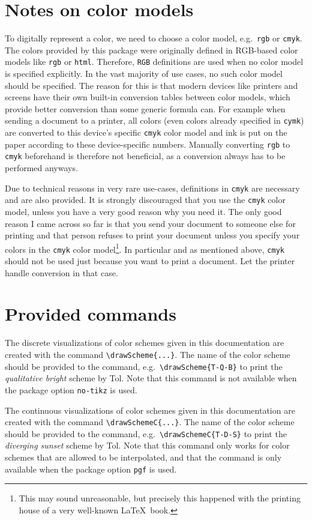 \documentclass{scrartcl}
\newcommand\marg[1]{\leavevmode\marginpar{\raggedleft #1}}
\newcommand\tbs{\textbackslash}
\newcommand\cs[1]{\texttt{\tbs#1}}
\begin{document}
\section{Notes on color models}
To digitally represent a color, we need to choose a color model, e.g.\ \texttt{rgb} or \texttt{cmyk}.
The colors provided by this package were originally defined in RGB-based color models like \texttt{rgb} or \texttt{html}.
Therefore, \texttt{RGB} definitions are used when no color model is specified explicitly.
In the vast majority of use cases, no such color model should be specified.
The reason for this is that modern devices like printers and screens have their own built-in conversion tables between color models, which provide better conversion than some generic formula can.
For example when sending a document to a printer, all colors (even colors already specified in \texttt{cymk}) are converted to this device's specific \texttt{cmyk} color model and ink is put on the paper according to these device-specific numbers.
Manually converting \texttt{rgb} to \texttt{cmyk} beforehand is therefore not beneficial, as a conversion always has to be performed anyways.

Due to technical reasons in very rare use-cases, definitions in \texttt{cmyk} are necessary and are also provided.
It is strongly discouraged that you use the \texttt{cmyk} color model, unless you have a very good reason why you need it.
The only good reason I came across so far is that you send your document to someone else for printing and that person refuses to print your document unless you specify your colors in the \texttt{cmyk} color model\footnote{This may sound unreasonable, but precisely this happened with the printing house of a very well-known \LaTeX\ book.}.
In particular and as mentioned above, \texttt{cmyk} should not be used just because you want to print a document.
Let the printer handle conversion in that case.

\section{Provided commands}
\marg{\cs{drawScheme\{...\}}}%
The discrete visualizations of color schemes given in this documentation are created with the command \cs{drawScheme\{...\}}.
The name of the color scheme should be provided to the command, e.g.\ \cs{drawScheme\{T-Q-B\}} to print the \emph{qualitative bright} scheme by Tol.
Note that this command is not available when the package option \texttt{no-tikz} is used.

\marg{\cs{drawSchemeC\{...\}}}%
The continuous visualizations of color schemes given in this documentation are created with the command \cs{drawSchemeC\{...\}}.
The name of the color scheme should be provided to the command, e.g.\ \cs{drawSchemeC\{T-D-S\}} to print the \emph{diverging sunset} scheme by Tol.
Note that this command only works for color schemes that are allowed to be interpolated, and that the command is only available when the package option \texttt{pgf} is used.

\clearpage
\printbibliography
\end{document}
